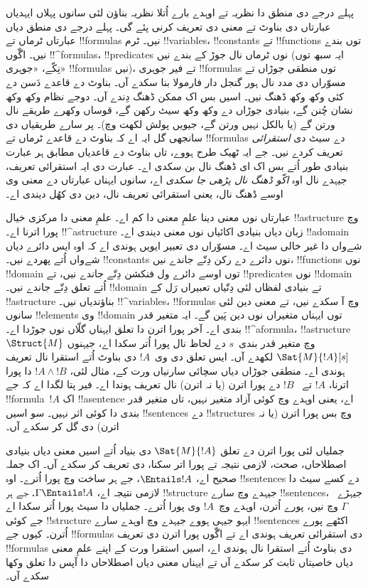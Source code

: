 \documentclass[../../../include/open-logic-section]{subfiles}
\begin{document}


پہلے درجے دی منطق دا نظریہ تے اوہدے بارے اُتلا نظریہ بناؤن لئی سانوں پہلاں ایہدیاں عبارتاں دی بناوٹ تے معنی دی تعریف کرنی پئے گی۔ پہلے درجے دی منطق دیاں عبارتاں ٹرماں تے !!{formula}s نیں۔ ٹرم !!{variable}s، !!{constant}s تے !!{function}s توں بندے نیں۔ اگّوں !!^{formula}s، !!{predicate}s نوں ٹرماں نال جوڑ کے بندے نیں (ایہ سبھ توں نِکّے، «جوہری» !!{formula}s نیں)، تے فیر جوہری !!{formula}s توں منطقی جوڑاں تے مسوّراں دی مدد نال ہور گنجل دار فارمولا بنا سکدے آں۔ بناوٹ دے قاعدے دَسن دے کئی وکھ وکھ ڈھنگ نیں۔ اسیں بس اک ممکن ڈھنگ دِندے آں۔ دوجے نظام وکھ وکھ نشان چُنن گے، بنیادی جوڑاں دے وکھ وکھ سیٹ رکھن گے، قوساں وکھرے طریقے نال ورتن گے (یا بالکل نہیں ورتن گے، جیویں پولش لکھت وچ)۔ پر سارے طریقیاں دی سانجھی گل ایہ اے کہ بناوٹ دے قاعدے ٹرماں تے !!{formula}s دے سیٹ دی \emph{استقرائی} تعریف کردے نیں۔ جے ایہ ٹھیک طرح ہووے، تاں بناوٹ دے قاعدیاں مطابق ہر عبارت بنیادی طور اُتے بس اک ای ڈھنگ نال بن سکدی اے۔ عبارت دی ایہ استقرائی تعریف، جیہدے نال اوہ \emph{اکّو ڈھنگ نال پڑھی جا سکدی} اے، سانوں ایہناں عبارتاں دے معنی وی اوسے ڈھنگ نال، یعنی استقرائی تعریف نال، دین دی کھُل دیندی اے۔

عبارتاں نوں معنی دینا علمِ معنی دا کم اے۔ علمِ معنی دا مرکزی خیال !!a{structure} وچ پورا اترنا اے۔ !!^a{structure} زبان دیاں بنیادی اکائیاں نوں معنی دیندی اے۔ !!a{domain} شےواں دا غیر خالی سیٹ اے۔ مسوّراں دی تعبیر ایویں ہوندی اے کہ اوہ ایس دائرے دیاں شےواں اُتے پھردے نیں۔ !!{constant}s نوں دائرے دے رکن دِتّے جاندے نیں، !!{function}s نوں !!{domain} توں اوسے دائرے ول فنکشن دِتّے جاندے نیں، تے !!{predicate}s نوں !!{domain} اُتے تعلق دِتّے جاندے نیں۔ !!{domain} تے بنیادی لفظاں لئی دِتّیاں تعبیراں رَل کے !!a{structure} بناؤندیاں نیں۔ !!^{variable}s، !!{formula}s وچ آ سکدے نیں، تے معنی دین لئی سانوں !!{element}s وی !!{domain} توں ایہناں متغیراں نوں دین پَین گے۔ ایہ متغیر قدر بندی اے۔ آخر پورا اترن دا تعلق ایہناں گلّاں نوں جوڑدا اے۔ !!^a{formula}، !!a{structure}~$\Struct{M}$ وچ متغیر قدر بندی~$s$ دے لحاظ نال پورا اُتر سکدا اے، جیہنوں $\Sat{M}{!A}[s]$ لکھدے آں۔ ایس تعلق دی وی~$!A$ دی بناوٹ اُتے استقرا نال تعریف ہوندی اے۔ منطقی جوڑاں دیاں سچائی سارنیاں ورت کے، مثال لئی، $!A \land !B$ دا پورا اترنا، $!A$ تے ~$!B$ دے پورا اترن (یا نہ اترن) نال تعریف ہوندا اے۔ فیر پتا لگدا اے کہ جے !!{formula}~$!A$ اک !!a{sentence} اے، یعنی اوہدے وچ کوئی آزاد متغیر نہیں، تاں متغیر قدر بندی دا کوئی اثر نہیں۔ سو اسیں !!{sentence}s دے !!{structure}s وچ بس پورا اترن (یا نہ اترن) دی گل کر سکدے آں۔

جملیاں لئی پورا اترن دے تعلق $\Sat{M}{!A}$ دی بنیاد اُتے اسیں معنی دیاں بنیادی اصطلاحاں، صحت، لازمی نتیجہ تے پورا اتر سکنا، دی تعریف کر سکدے آں۔ اک جملہ صحیح اے، $\Entails !A$، جے ہر ساخت وچ پورا اُترے۔ اوہ !!{sentence}s دے کسے سیٹ دا لازمی نتیجہ اے، $\Gamma \Entails !A$، جے ہر !!{structure} جیہدے وچ سارے !!{sentence}s، جیہڑے~$\Gamma$ وچ نیں، پورے اُترن، اوہدے وچ~$!A$ وی پورا اُترے۔ جملیاں دا سیٹ پورا اُتر سکدا اے جے کوئی !!{structure} ایہو جیہی ہووے جیہدے وچ اوہدے سارے !!{sentence}s اکٹھے پورے اُترن۔ کیوں جے !!{formula}s دی استقرائی تعریف ہوندی اے تے اگّوں پورا اترن دی تعریف !!{formula}s دی بناوٹ اُتے استقرا نال ہوندی اے، اسیں استقرا ورت کے اپنے علمِ معنی دیاں خاصیتاں ثابت کر سکدے آں تے ایہناں معنی دیاں اصطلاحاں دا آپس دا تعلق وکھا سکدے آں۔
\end{document}
